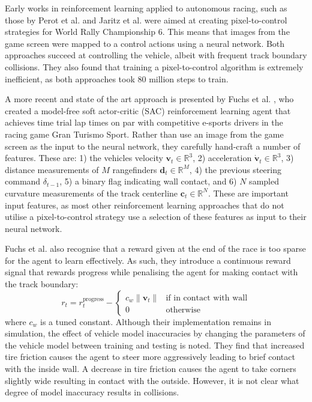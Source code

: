 Early works in reinforcement learning applied to autonomous racing, such as those by Perot et al. \cite{Perot2017} and Jaritz et al. \cite{Jaritz2018} were aimed at creating pixel-to-control strategies for World Rally Championship 6.
This means that images from the game screen were mapped to a control actions using a neural network. 
Both approaches succeed at controlling the vehicle, albeit with frequent track boundary collisions.
They also found that training a pixel-to-control algorithm is extremely inefficient, as both approaches took 80 million steps to train.

A more recent and state of the art approach is presented by Fuchs et al. \cite{Fuchs2021}, who created a model-free soft actor-critic (SAC) reinforcement learning agent that achieves time trial lap times on par with competitive e-sports drivers in the racing game Gran Turismo Sport.
Rather than use an image from the game screen as the input to the neural network, they carefully hand-craft a number of features. These are: 1) the vehicles velocity $\pmb{v}_t \in \mathbb{R}^3$, 2) acceleration $\pmb{\dot{v}}_t \in \mathbb{R}^3$, 3) distance measurements of $M$ rangefinders $\pmb{d}_t \in \mathbb{R}^M$, 4) the previous steering command $\delta_{t-1}$, 5) a binary flag indicating wall contact, and 6) $N$ sampled curvature measurements of the track centerline $\pmb{c}_t \in \mathbb{R}^N$.
These are important input features, as most other reinforcement learning approaches that do not utilise a pixel-to-control strategy use a selection of these features as input to their neural network.

Fuchs et al. \cite{Fuchs2021} also recognise that a reward given at the end of the race is too sparse for the agent to learn effectively. As such, they introduce a continuous reward signal that rewards progress while penalising the agent for making contact with the track boundary:
\begin{equation}
    r_t = r_{t}^{\text{progress}} - 
    \begin{cases}
    c_w \| \pmb{v}_t \| & \text{if in contact with wall} \\
    0 & \text{otherwise}
    \end{cases}
\end{equation}
where $c_w$ is a tuned constant.
Although their implementation remains in simulation, the effect of vehicle model inaccuracies by changing the parameters of the vehicle model between training and testing is noted. They find that increased tire friction causes the agent to steer more aggressively leading to brief contact with the inside wall. A decrease in tire friction causes the agent to take corners slightly wide resulting in contact with the outside.
However, it is not clear what degree of model inaccuracy results in collisions.

